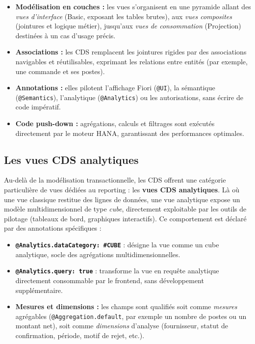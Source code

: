 \documentclass[12pt,a4paper,oneside]{report}
\begin{document}
\begin{itemize}[label=---, itemsep=0.2em]
	\item \textbf{Modélisation en couches :} les vues s'organisent en une pyramide
	allant des \textit{vues d'interface} (Basic, exposant les tables brutes), aux
	\textit{vues composites} (jointures et logique métier), jusqu'aux \textit{vues de
	consommation} (Projection) destinées à un cas d'usage précis.
	\item \textbf{Associations :} les CDS remplacent les jointures rigides par des
	associations navigables et réutilisables, exprimant les relations entre entités
	(par exemple, une commande et ses postes).
	\item \textbf{Annotations :} elles pilotent l'affichage Fiori (\texttt{@UI}), la
	sémantique (\texttt{@Semantics}), l'analytique (\texttt{@Analytics}) ou les
	autorisations, sans écrire de code impératif.
	\item \textbf{Code push-down :} agrégations, calculs et filtrages sont exécutés
	directement par le moteur HANA, garantissant des performances optimales.
\end{itemize}

\subsection{Les vues CDS analytiques}\label{ch2:cds-analytique}

Au-delà de la modélisation transactionnelle, les CDS offrent une catégorie particulière
de vues dédiées au reporting : les \textbf{vues CDS analytiques}. Là où une vue classique
restitue des lignes de données, une vue analytique expose un modèle multidimensionnel de
type \textit{cube}, directement exploitable par les outils de pilotage (tableaux de bord,
graphiques interactifs). Ce comportement est déclaré par des annotations spécifiques :

\begin{itemize}[label=---, itemsep=0.2em]
	\item \textbf{\texttt{@Analytics.dataCategory: \#CUBE}} : désigne la vue comme un cube
	analytique, socle des agrégations multidimensionnelles.
	\item \textbf{\texttt{@Analytics.query: true}} : transforme la vue en requête
	analytique directement consommable par le frontend, sans développement
	supplémentaire.
	\item \textbf{Mesures et dimensions :} les champs sont qualifiés soit comme
	\textit{mesures} agrégables (\texttt{@Aggregation.default}, par exemple un nombre de
	postes ou un montant net), soit comme \textit{dimensions} d'analyse (fournisseur,
	statut de confirmation, période, motif de rejet, etc.).
\end{itemize}
\end{document}

